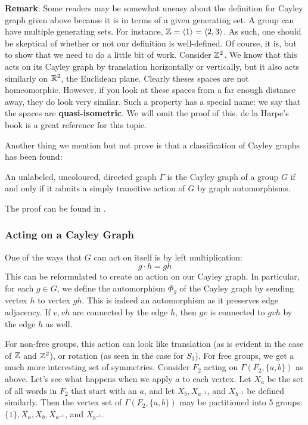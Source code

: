 \vspace{0.5cm}

\noindent \textbf{Remark}: Some readers may be somewhat uneasy about the definition for Cayley graph given above because it is in terms of a given generating set. A group can have multiple generating sets. For instance, $\mathbb{Z} = \langle 1\rangle = \langle 2,3 \rangle$. As such, one should be skeptical of whether or not our definition is well-defined. Of course, it is, but to show that we need to do a little bit of work. Consider $\mathbb{Z}^2$. We know that this acts on its Cayley graph by translation horizontally or vertically, but it also acts similarly on $\mathbb{R}^2$, the Euclidean plane. Clearly theses spaces are not homeomorphic. However, if you look at these spaces from a far enough distance away, they do look very similar. Such a property has a special name: we say that the spaces are \textbf{quasi-isometric}. We will omit the proof of this. de la Harpe's book \cite{delaHarpe2000} is a great reference for this topic.

Another thing we mention but not prove is that a classification of Cayley graphs has been found: 
\begin{thm}
    An unlabeled, uncoloured, directed graph $\Gamma$ is the Cayley graph of a group $G$ if and only if it admits a simply transitive action of $G$ by graph automorphisms. 
\end{thm}
The proof can be found in \cite{Sabidussi1958}. 

\subsubsection{Acting on a Cayley Graph}

One of the ways that $G$ can act on itself is by left multiplication:
\[
    g \cdot h = gh
\]
This can be reformulated to create an action on our Cayley graph. In particular, for each $g \in G$, we define the automorphism $\Phi_g$ of the Cayley graph by sending vertex $h$ to vertex $gh$. This is indeed an automorphism as it preserves edge adjacency. If $v, vh$ are connected by the edge $h$, then $gv$ is connected to $gvh$ by the edge $h$ as well. 

For non-free groups, this action can look like translation (as is evident in the case of $\mathbb{Z}$ and $\mathbb{Z}^2$), or rotation (as seen in the case for $S_3$). For free groups, we get a much more interesting set of symmetries. Consider $F_2$ acting on $\Gamma(F_2, \{a,b\})$ as above. Let's see what happens when we apply $a$ to each vertex. Let $X_a$ be the set of all words in $F_2$ that start with an $a$, and let $X_b, X_{a^{-1}}$, and $X_{b^{-1}}$ be defined similarly. Then the vertex set of $\Gamma(F_2,\{a,b\})$ may be partitioned into 5 groups: $\{1\}, X_a, X_b, X_{a^{-1}}$, and $X_{b^{-1}}$.

